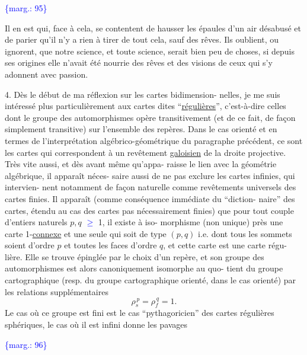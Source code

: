 \documentclass[11pt]{article}
\newcommand{\scanpage}[1]{\par\bigskip\noindent{\small\sffamily[scan #1]}\par}
\newcommand{\mspage}[1]{{\small\sffamily[p.\,#1]}}
\newcommand{\hand}[1]{\textcolor{blue}{#1}}
\newcommand{\margin}[1]{\textcolor{blue}{\{\textsf{marg.:} #1\}}}
\newcommand{\uline}[1]{\underline{#1}}
\begin{document}
\margin{95}

\clearpage
\scanpage{119/96}
\mspage{18}

Il en est qui, face à cela, se contentent de hausser les
épaules d'un air  désabusé et de parier qu'il n'y a rien à tirer
de tout cela, sauf des rêves. Ils oublient, ou ignorent, que notre
science, et toute science, serait bien peu  de choses, si depuis
ses origines elle n'avait été nourrie des rêves et des visions
de ceux qui s'y adonnent avec passion.

4.        Dès le début de ma réflexion sur les cartes bidimension-%
nelles, je me suis intéressé plus particulièrement aux cartes dites
``\uline{régulières}'', c'est-à-dire celles dont le groupe des automorphismes
opère transitivement (et de ce fait, de façon simplement transitive)
sur l'ensemble des repères. Dans le cas orienté et en termes de
l'interprétation algébrico-géométrique du paragraphe précédent,
ce sont les cartes qui correspondent à un revêtement \uline{galoisien} de
la droite projective. Très vite aussi, et dès avant même qu'appa-%
raisse le lien avec la géométrie algébrique, il apparaît néces-%
saire aussi de ne pas exclure les cartes infinies, qui intervien-%
nent notamment de façon naturelle comme revêtements universels des
cartes finies. Il apparaît (comme conséquence immédiate du ``diction-%
naire'' des cartes, étendu au cas des cartes pas nécessairement finies)
que pour tout couple d'entiers naturels  $p, q$ \hand{$\geq$} 1, il existe à iso-%
morphisme (non unique) près une carte 1-\uline{connexe} et une seule qui
soit de type  $(p,q)$  i.e. dont tous les sommets soient d'ordre  $p$
et toutes les faces d'ordre  $q$, et cette carte est une carte régu-%
lière. Elle se trouve épinglée par le choix d'un repère, et son
groupe des automorphismes est alors canoniquement isomorphe au quo-%
tient du groupe cartographique (resp. du groupe cartographique
orienté, dans le cas orienté) par les relations supplémentaires
\[ \rho_s^{\,p} = \rho_f^{\,q} = 1. \]
Le cas où ce groupe est fini est le cas ``pythagoricien'' des cartes
régulières sphériques, le cas où il est infini donne les pavages

\margin{96}
\end{document}
